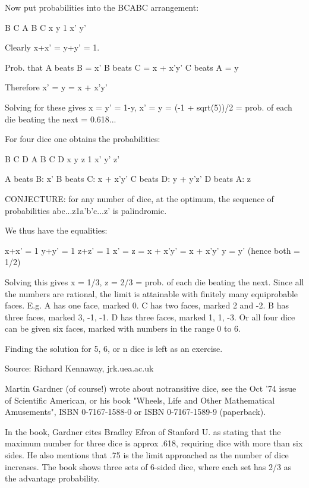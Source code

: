 {Now put probabilities into the BCABC arrangement:

    B  C  A  B  C
    x  y  1  x' y'

Clearly x+x' = y+y' = 1.

Prob. that A beats B = x'
           B beats C = x + x'y'
           C beats A = y

Therefore x' = y = x + x'y'

Solving for these gives x = y' = 1-y, x' = y = (-1 + sqrt(5))/2 = prob.
of each die beating the next = 0.618...

For four dice one obtains the probabilities:

    B  C  D  A  B  C  D
    x  y  z  1  x' y' z'

A beats B:  x'
B beats C:  x + x'y'
C beats D:  y + y'z'
D beats A:  z

CONJECTURE: for any number of dice, at the optimum, the sequence of
probabilities abc...z1a'b'c...z' is palindromic.

We thus have the equalities:

    x+x' = 1
    y+y' = 1
    z+z' = 1
    x' = z = x + x'y' = x + x'y'
    y = y' (hence both = 1/2)

Solving this gives x = 1/3, z = 2/3 = prob. of each die beating the next.
 Since all the numbers are rational, the limit is attainable with
finitely many equiprobable faces.  E.g. A has one face, marked 0.  C has
two faces, marked 2 and -2.  B has three faces, marked 3, -1, -1.  D has
three faces, marked 1, 1, -3.  Or all four dice can be given six faces,
marked with numbers in the range 0 to 6.

Finding the solution for 5, 6, or n dice is left as an exercise.

Source: Richard Kennaway, jrk\@sys.uea.ac.uk    \par


Martin Gardner (of course!) wrote about notransitive dice, see the Oct '74
issue of Scientific American, or his book "Wheels, Life and Other Mathematical
Amusements", ISBN 0-7167-1588-0 or ISBN 0-7167-1589-9 (paperback).

In the book, Gardner cites Bradley Efron of Stanford U. as stating that
the maximum number for three dice is approx .618, requiring dice with more
than six sides.  He also mentions that .75 is the limit approached as the
number of dice increases.  The book shows three sets of 6-sided dice, where
each set has 2/3 as the advantage probability. }






